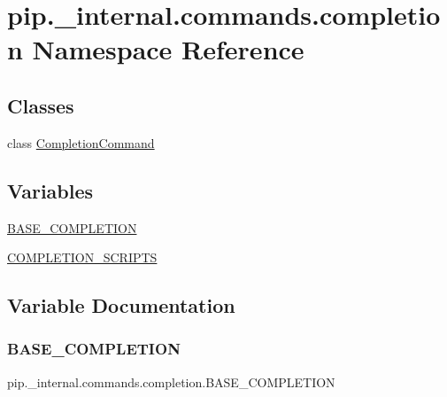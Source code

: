 \hypertarget{namespacepip_1_1__internal_1_1commands_1_1completion}{}\section{pip.\+\_\+internal.\+commands.\+completion Namespace Reference}
\label{namespacepip_1_1__internal_1_1commands_1_1completion}
\subsection*{Classes}
\begin{DoxyCompactItemize}
\item 
class \hyperlink{classpip_1_1__internal_1_1commands_1_1completion_1_1CompletionCommand}{Completion\+Command}
\end{DoxyCompactItemize}
\subsection*{Variables}
\begin{DoxyCompactItemize}
\item 
\hyperlink{namespacepip_1_1__internal_1_1commands_1_1completion_aba7d1f06f9a22fdaf01d5ff8d1380bb3}{B\+A\+S\+E\+\_\+\+C\+O\+M\+P\+L\+E\+T\+I\+ON}
\item 
\hyperlink{namespacepip_1_1__internal_1_1commands_1_1completion_ab5a642a62efa7595ac204c5a49615f31}{C\+O\+M\+P\+L\+E\+T\+I\+O\+N\+\_\+\+S\+C\+R\+I\+P\+TS}
\end{DoxyCompactItemize}


\subsection{Variable Documentation}
\mbox{\label{namespacepip_1_1__internal_1_1commands_1_1completion_aba7d1f06f9a22fdaf01d5ff8d1380bb3}} 
\subsubsection{\texorpdfstring{B\+A\+S\+E\+\_\+\+C\+O\+M\+P\+L\+E\+T\+I\+ON}{BASE\_COMPLETION}}
{\footnotesize\ttfamily pip.\+\_\+internal.\+commands.\+completion.\+B\+A\+S\+E\+\_\+\+C\+O\+M\+P\+L\+E\+T\+I\+ON}

